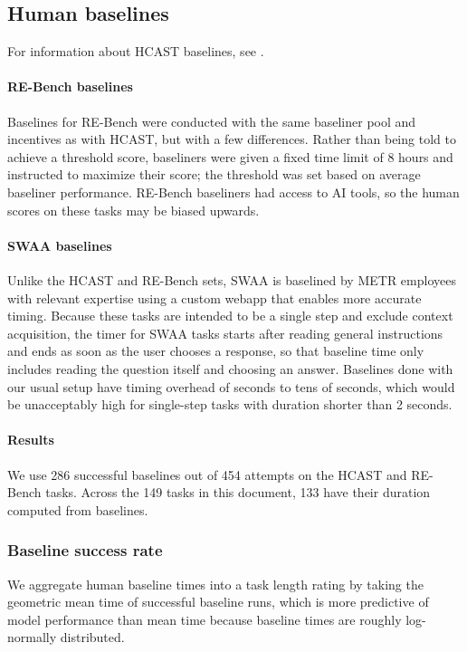 \documentclass{article}
\newcommand{\gabenchmark}{HCAST}
\newcommand{\numsuccessfulbaselines}{286}
\begin{document}
\subsection{Human baselines} \label{appendix:baselining}

For information about \gabenchmark{} baselines, see \citet{METR_HCAST}.

\paragraph{RE-Bench baselines} Baselines for RE-Bench were conducted with the same baseliner pool and incentives as with \gabenchmark{}, but with a few differences. Rather than being told to achieve a threshold score, baseliners were given a fixed time limit of 8 hours and instructed to maximize their score; the threshold was set based on average baseliner performance. RE-Bench baseliners had access to AI tools, so the human scores on these tasks may be biased upwards.

\paragraph{SWAA baselines} Unlike the \gabenchmark{} and RE-Bench sets, SWAA is baselined by METR employees with relevant expertise using a custom webapp that enables more accurate timing. Because these tasks are intended to be a single step and exclude context acquisition, the timer for SWAA tasks starts after reading general instructions and ends as soon as the user chooses a response, so that baseline time only includes reading the question itself and choosing an answer. Baselines done with our usual setup have timing overhead of seconds to tens of seconds, which would be unacceptably high for single-step tasks with duration shorter than 2 seconds.

\paragraph{Results}
We use \numsuccessfulbaselines{} successful baselines out of 454 attempts on the \gabenchmark{} and RE-Bench tasks. Across the 149 tasks in this document, 133 have their duration computed from baselines.

\subsubsection{Baseline success rate} \label{app:baseline-success-rate}
We aggregate human baseline times into a task length rating by taking the geometric mean time of successful baseline runs, which is more predictive of model performance than mean time because baseline times are roughly log-normally distributed. 
\end{document}
